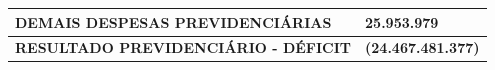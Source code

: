 \documentclass{article}
\begin{document}
\begin{longtable}[c]{m{12cm}m{3cm}}
\multicolumn{1}{L{12cm}}{\hspace{4em} DEMAIS DESPESAS PREVIDENCIÁRIAS} & \multicolumn{1}{R{3cm}}{25.953.979} \\
\hline\hline
\multicolumn{1}{L{12cm}}{\hspace{0em} \textbf{ RESULTADO PREVIDENCIÁRIO - DÉFICIT }} & \multicolumn{1}{R{3cm}}{\textbf{ (24.467.481.377) }} \\\hline\hline\end{longtable}\raggedright\fontsize{7pt}{10pt}\selectfont {Fonte: PPO.} \\\fontsize{7pt}{10pt}\selectfont {ELABORAÇÃO: DCAF/SCPPO/SEPLAG}\\
\end{document}
